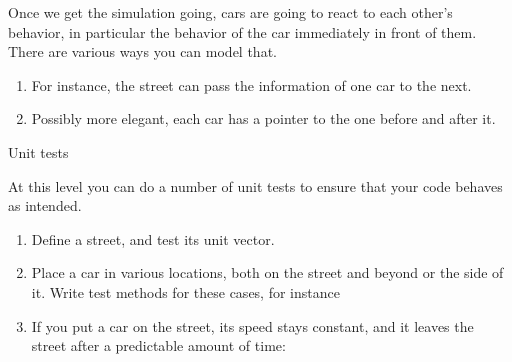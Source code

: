 Once we get the simulation going,
cars are going to react to each other's behavior,
in particular the behavior of the car immediately in front of them.
There are various ways you can model that.
\begin{enumerate}
\item
  For instance, 
  the street can pass the information of one car to the next.
\item Possibly more elegant, each car has a pointer to the one
  before and after it.
\end{enumerate}

 {Unit tests}

At this level you can do a number of unit tests to ensure that your code
behaves as intended.
\begin{enumerate}
\item Define a street, and test its unit vector.
\item Place a car in various locations, both on the street and
  beyond or the side of it. Write test methods for these cases,
  for instance
\item If you put a car on the street, its speed stays constant,
  and it leaves the street after a predictable amount of time:
\end{enumerate}

